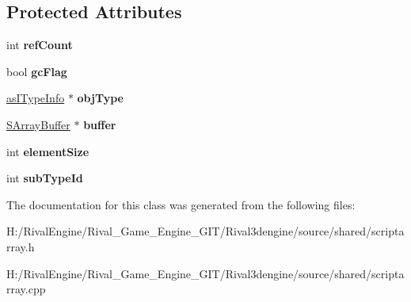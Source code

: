 \subsection*{Protected Attributes}
\begin{DoxyCompactItemize}
\item 
\mbox{\label{class_c_script_array_ac2ada6d851d5e606ecaf915805e411c6}} 
int {\bfseries ref\+Count}
\item 
\mbox{\label{class_c_script_array_ad9b81bca74db2f95bb71f70b63b3eda6}} 
bool {\bfseries gc\+Flag}
\item 
\mbox{\label{class_c_script_array_a13f504dcd4f6e6a096a8afb632ff8f90}} 
\hyperlink{classas_i_type_info}{as\+I\+Type\+Info} $\ast$ {\bfseries obj\+Type}
\item 
\mbox{\label{class_c_script_array_a60601db371fb5f7a0b19a29078c9ec66}} 
\hyperlink{struct_s_array_buffer}{S\+Array\+Buffer} $\ast$ {\bfseries buffer}
\item 
\mbox{\label{class_c_script_array_aeef72ead23390babbf2502381a469419}} 
int {\bfseries element\+Size}
\item 
\mbox{\label{class_c_script_array_a9d112cbe0aba514e3551e30908903215}} 
int {\bfseries sub\+Type\+Id}
\end{DoxyCompactItemize}


The documentation for this class was generated from the following files\+:\begin{DoxyCompactItemize}
\item 
H\+:/\+Rival\+Engine/\+Rival\+\_\+\+Game\+\_\+\+Engine\+\_\+\+G\+I\+T/\+Rival3dengine/source/shared/scriptarray.\+h\item 
H\+:/\+Rival\+Engine/\+Rival\+\_\+\+Game\+\_\+\+Engine\+\_\+\+G\+I\+T/\+Rival3dengine/source/shared/scriptarray.\+cpp\end{DoxyCompactItemize}
